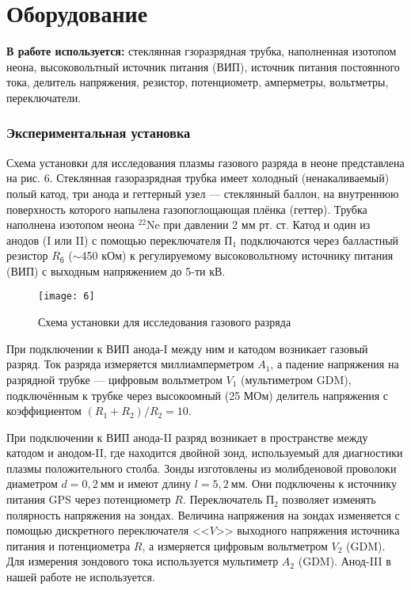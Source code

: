 \section{Оборудование}
\textbf{В работе используется:}
стеклянная гзоразрядная трубка,
наполненная изотопом неона,
высоковольтный источник питания (ВИП),
источник питания постоянного тока,
делитель напряжения, резистор,
потенциометр, амперметры, вольтметры,
переключатели.  

\subsubsection*{Экспериментальная установка}
Схема
установки для исследования плазмы
газового разряда в неоне представлена на
рис. 6. Стеклянная газоразрядная трубка
имеет холодный (ненакаливаемый) полый
катод, три анода и геттерный узел —
стеклянный баллон, на внутреннюю
поверхность которого напылена
газопоглощающая плёнка (геттер). Трубка
наполнена изотопом неона $^{22}$Ne при
давлении 2 мм рт. ст. Катод и один из
анодов (I или II) с помощью
переключателя $\text{П}_1$ подключаются через
балластный резистор $R_\text{б}$ ($\sim$450 кОм) к
регулируемому высоковольтному источнику
питания (ВИП) с выходным напряжением до
5-ти кВ.

\begin{figure}[H]
    \texttt{[image: 6]}
    \captionsetup{justification=centering}
    \caption{Схема установки для
    исследования газового разряда}
\end{figure}

При подключении к ВИП анода-I между ним
и катодом возникает газовый разряд. Ток
разряда измеряется миллиамперметром $A_1$,
а падение напряжения на разрядной трубке
— цифровым вольтметром $V_1$ (мультиметром
GDM), подключённым к трубке через
высокоомный (25 МОм) делитель напряжения
с коэффициентом $(R_1+R_2)/R_2 = 10$.

При подключении к ВИП анода-II разряд
возникает в пространстве между катодом и
анодом-II, где находится двойной зонд,
используемый для диагностики плазмы
положительного столба. Зонды изготовлены
из молибденовой проволоки диаметром $d =
0,2 \ \text{мм}$ и имеют длину $l = 5,2
\ \text{мм}$. Они
подключены к источнику питания GPS через
потенциометр $R$. Переключатель П$_2$
позволяет изменять полярность напряжения
на зондах. Величина напряжения на зондах
изменяется с помощью дискретного
переключателя <<$V$>> выходного напряжения
источника питания и потенциометра $R$, а
измеряется цифровым вольтметром $V_2$ 
(GDM). Для измерения зондового тока
используется мультиметр $A_2$ (GDM).
Анод-III в нашей работе не используется.

